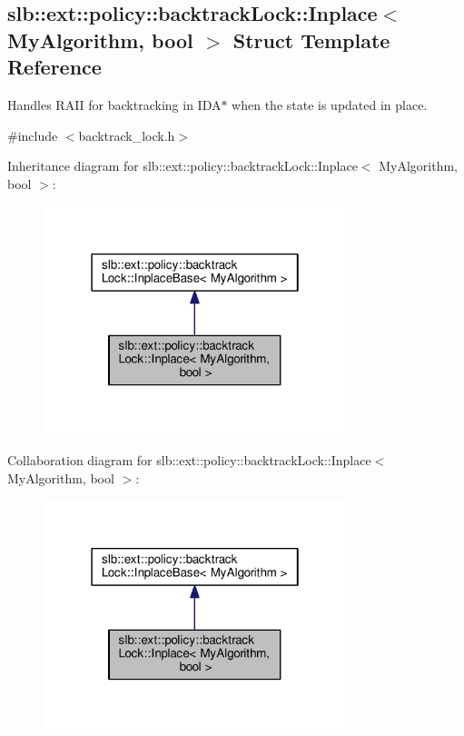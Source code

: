 \hypertarget{structslb_1_1ext_1_1policy_1_1backtrackLock_1_1Inplace}{}\subsection{slb\+:\+:ext\+:\+:policy\+:\+:backtrack\+Lock\+:\+:Inplace$<$ My\+Algorithm, bool $>$ Struct Template Reference}
\label{structslb_1_1ext_1_1policy_1_1backtrackLock_1_1Inplace}


Handles R\+A\+II for backtracking in I\+D\+A$\ast$ when the state is updated in place.  




{\ttfamily \#include $<$backtrack\+\_\+lock.\+h$>$}



Inheritance diagram for slb\+:\+:ext\+:\+:policy\+:\+:backtrack\+Lock\+:\+:Inplace$<$ My\+Algorithm, bool $>$\+:\nopagebreak
\begin{figure}[H]
\begin{center}
\leavevmode
\includegraphics[width=250pt]{structslb_1_1ext_1_1policy_1_1backtrackLock_1_1Inplace__inherit__graph}
\end{center}
\end{figure}


Collaboration diagram for slb\+:\+:ext\+:\+:policy\+:\+:backtrack\+Lock\+:\+:Inplace$<$ My\+Algorithm, bool $>$\+:\nopagebreak
\begin{figure}[H]
\begin{center}
\leavevmode
\includegraphics[width=250pt]{structslb_1_1ext_1_1policy_1_1backtrackLock_1_1Inplace__coll__graph}
\end{center}
\end{figure}
